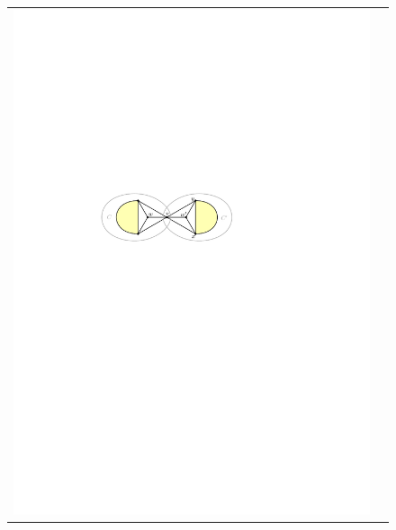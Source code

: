 \documentclass[a4paper,UKenglish,cleveref, autoref, thm-restate]{lipics-v2021}
\begin{document}
\begin{figure}[htpb]
  \centering
  \begin{tabular}{cc}
    \includegraphics[page=1]{figs/isolated} &

\end{tabular}
\end{figure}
\end{document}
